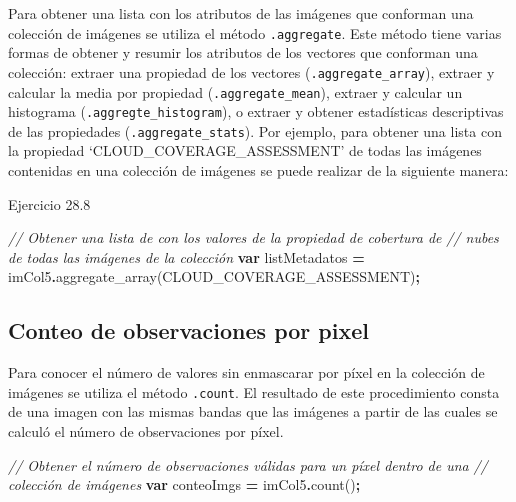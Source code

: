 \documentclass[
  12pt,
  letterpaper,
  twoside]{book}
\newenvironment{Shaded}{\begin{snugshade}}{\end{snugshade}}
\newcommand{\CommentTok}[1]{\textcolor[rgb]{0.56,0.35,0.01}{\textit{#1}}}
\newcommand{\FunctionTok}[1]{\textcolor[rgb]{0.00,0.00,0.00}{#1}}
\newcommand{\KeywordTok}[1]{\textcolor[rgb]{0.13,0.29,0.53}{\textbf{#1}}}
\newcommand{\NormalTok}[1]{#1}
\newcommand{\OperatorTok}[1]{\textcolor[rgb]{0.81,0.36,0.00}{\textbf{#1}}}
\newcommand{\StringTok}[1]{\textcolor[rgb]{0.31,0.60,0.02}{#1}}
\begin{document}
Para obtener una lista con los atributos de las imágenes que conforman una colección de imágenes se utiliza el método \texttt{.aggregate}. Este método tiene varias formas de obtener y resumir los atributos de los vectores que conforman una colección: extraer una propiedad de los vectores (\texttt{.aggregate\_array}), extraer y calcular la media por propiedad (\texttt{.aggregate\_mean}), extraer y calcular un histograma (\texttt{.aggregte\_histogram}), o extraer y obtener estadísticas descriptivas de las propiedades (\texttt{.aggregate\_stats}). Por ejemplo, para obtener una lista con la propiedad `CLOUD\_COVERAGE\_ASSESSMENT' de todas las imágenes contenidas en una colección de imágenes se puede realizar de la siguiente manera:

Ejercicio 28.8

\begin{Shaded}
\begin{Highlighting}[]
\CommentTok{// Obtener una lista de con los valores de la propiedad de cobertura de }
\CommentTok{// nubes de todas las imágenes de la colección}
\KeywordTok{var}\NormalTok{ listMetadatos }\OperatorTok{=}\NormalTok{ imCol5}\OperatorTok{.}\FunctionTok{aggregate\_array}\NormalTok{(}\StringTok{\textquotesingle{}CLOUD\_COVERAGE\_ASSESSMENT\textquotesingle{}}\NormalTok{)}\OperatorTok{;}
\end{Highlighting}
\end{Shaded}

\hypertarget{conteo-de-observaciones-por-pixel}{%
\subsection*{Conteo de observaciones por pixel}\label{conteo-de-observaciones-por-pixel}}

Para conocer el número de valores sin enmascarar por píxel en la colección de imágenes se utiliza el método \texttt{.count}. El resultado de este procedimiento consta de una imagen con las mismas bandas que las imágenes a partir de las cuales se calculó el número de observaciones por píxel.

\begin{Shaded}
\begin{Highlighting}[]
\CommentTok{// Obtener el número de observaciones válidas para un píxel dentro de una }
\CommentTok{// colección de imágenes}
\KeywordTok{var}\NormalTok{ conteoImgs }\OperatorTok{=}\NormalTok{ imCol5}\OperatorTok{.}\FunctionTok{count}\NormalTok{()}\OperatorTok{;}
\end{Highlighting}
\end{Shaded}
\end{document}
